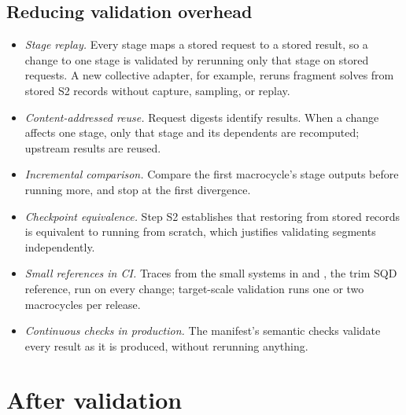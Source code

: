 \documentclass[11pt,a4paper]{article}
\begin{document}
\subsection{Reducing validation overhead}

\begin{itemize}
  \item \emph{Stage replay.} Every stage maps a stored request to a stored
  result, so a change to one stage is validated by rerunning only that stage on
  stored requests. A new collective adapter, for example, reruns fragment
  solves from stored S2 records without capture, sampling, or replay.
  \item \emph{Content-addressed reuse.} Request digests identify results. When
  a change affects one stage, only that stage and its dependents are
  recomputed; upstream results are reused.
  \item \emph{Incremental comparison.} Compare the first macrocycle's stage
  outputs before running more, and stop at the first divergence.
  \item \emph{Checkpoint equivalence.} Step S2 establishes that restoring from
  stored records is equivalent to running from scratch, which justifies
  validating segments independently.
  \item \emph{Small references in CI.} Traces from the small systems in
   and , the trim SQD reference, run on
  every change; target-scale
  validation runs one or two macrocycles per release.
  \item \emph{Continuous checks in production.} The manifest's semantic checks
  validate every result as it is produced, without rerunning anything.
\end{itemize}

\section{After validation}
\end{document}
